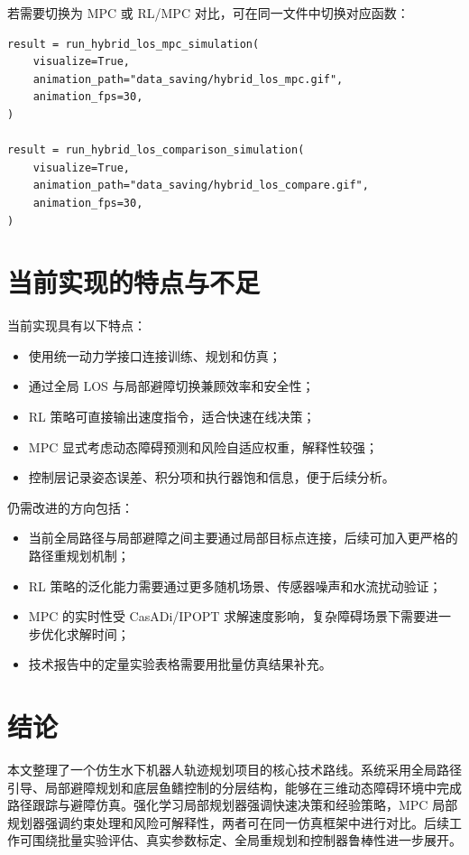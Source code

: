 \documentclass[UTF8,a4paper,12pt]{ctexart}
\begin{document}
若需要切换为 MPC 或 RL/MPC 对比，可在同一文件中切换对应函数：

\begin{lstlisting}[style=pythonstyle]
result = run_hybrid_los_mpc_simulation(
    visualize=True,
    animation_path="data_saving/hybrid_los_mpc.gif",
    animation_fps=30,
)

result = run_hybrid_los_comparison_simulation(
    visualize=True,
    animation_path="data_saving/hybrid_los_compare.gif",
    animation_fps=30,
)
\end{lstlisting}

\section{当前实现的特点与不足}

当前实现具有以下特点：
\begin{itemize}
  \item 使用统一动力学接口连接训练、规划和仿真；
  \item 通过全局 LOS 与局部避障切换兼顾效率和安全性；
  \item RL 策略可直接输出速度指令，适合快速在线决策；
  \item MPC 显式考虑动态障碍预测和风险自适应权重，解释性较强；
  \item 控制层记录姿态误差、积分项和执行器饱和信息，便于后续分析。
\end{itemize}

仍需改进的方向包括：
\begin{itemize}
  \item 当前全局路径与局部避障之间主要通过局部目标点连接，后续可加入更严格的路径重规划机制；
  \item RL 策略的泛化能力需要通过更多随机场景、传感器噪声和水流扰动验证；
  \item MPC 的实时性受 CasADi/IPOPT 求解速度影响，复杂障碍场景下需要进一步优化求解时间；
  \item 技术报告中的定量实验表格需要用批量仿真结果补充。
\end{itemize}

\section{结论}

本文整理了一个仿生水下机器人轨迹规划项目的核心技术路线。系统采用全局路径引导、局部避障规划和底层鱼鳍控制的分层结构，能够在三维动态障碍环境中完成路径跟踪与避障仿真。强化学习局部规划器强调快速决策和经验策略，MPC 局部规划器强调约束处理和风险可解释性，两者可在同一仿真框架中进行对比。后续工作可围绕批量实验评估、真实参数标定、全局重规划和控制器鲁棒性进一步展开。



\end{document}
